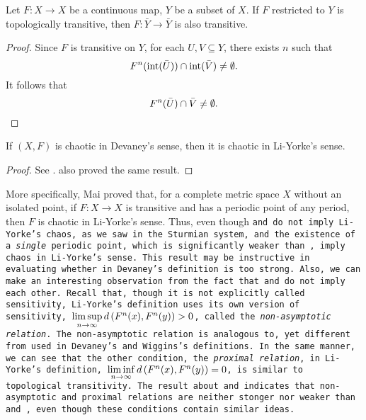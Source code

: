 \documentclass[10pt,twoside,draft]{book}
\begin{document}
\begin{proposition}
  Let $F: X \to X$ be a continuous map, $Y$ be a subset of $X$.
  If $F$ restricted to $Y$ is topologically transitive, then $F: \bar{Y} \to \bar{Y}$ is also transitive.
  \label{prop:closure-transitivity}
  \begin{proof}
    Since $F$ is transitive on $Y$, for each $U, V \subseteq Y$, there exists $n$ such that
    \begin{equation*}
      F^{n}(\mathrm{int}(\bar{U})) \cap \mathrm{int}(\bar{V}) \neq \emptyset.
    \end{equation*}
    It follows that
    \begin{equation*}
      F^{n}(\bar{U}) \cap \bar{V} \neq \emptyset.
    \end{equation*}
  \end{proof}
\end{proposition}

\begin{theorem}
  If $(X, F)$ is chaotic in Devaney's sense, then it is chaotic in Li-Yorke's sense.
  \begin{proof}
    See \citet{mai}.
    \citet{huang} also proved the same result.
  \end{proof}
  \label{thm:dev-liy}
\end{theorem}
More specifically, Mai proved that, for a complete metric space $X$ without an isolated point, if $F: X \to X$ is transitive and has a periodic point of any period, then $F$ is chaotic in Li-Yorke's sense.
Thus, even though \tt and \sdic do not imply Li-Yorke's chaos, as we saw in the Sturmian system, \tt and the existence of a \textit{single} periodic point, which is significantly weaker than \dpp, imply chaos in Li-Yorke's sense.
This result may be instructive in evaluating whether \dpp in Devaney's definition is too strong.
Also, we can make an interesting observation from the fact that \wig and \liy do not imply each other. 
Recall that, though it is not explicitly called sensitivity, Li-Yorke's definition uses its own version of sensitivity, $\limsup\limits_{n\to \infty} d\left( F^{n}(x), F^{n}(y) \right) > 0$, called the \textit{non-asymptotic relation}.
The non-asymptotic relation is analogous to, yet different from \sdic used in Devaney's and Wiggins's definitions.
In the same manner, we can see that the other condition, the \textit{proximal relation}, in Li-Yorke's definition, $\liminf\limits_{n\to \infty} d\left( F^{n}(x), F^{n}(y) \right) = 0$, is similar to topological transitivity.
The result about \wig and \liy indicates that non-asymptotic and proximal relations are neither stonger nor weaker than \tt and \sdic, even though these conditions contain similar ideas.
\end{document}
